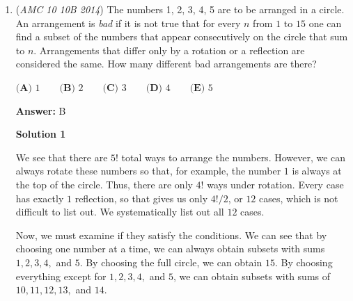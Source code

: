 \begin{enumerate}
 Thus,
 \[h = 2\sqrt{Rr}\]

 The volume of the frustum is:
 \[V_f = \frac{\pi h}{3}(R^2 + Rr + r^2) = \frac{2\pi\sqrt{Rr}}{3}(R^2 + Rr + r^2)\]

 The volume of the sphere is:
 \[V_s = \frac{4}{3}\pi a^3 = \frac{4}{3}\pi (Rr)^{3/2}\]

 The given condition $V_f = 2V_s$ becomes:
 \[\frac{2\pi\sqrt{Rr}}{3}(R^2 + Rr + r^2) = \frac{8\pi}{3}(Rr)^{3/2}\]

 Multiplying by $\frac{3}{\pi}$:
 \[2\sqrt{Rr}(R^2 + Rr + r^2) = 8(Rr)^{3/2}\]

 Dividing by $2\sqrt{Rr}$:
 \[R^2 + Rr + r^2 = 4Rr\]
 \[R^2 - 3Rr + r^2 = 0\]

 Dividing by $r^2$ and setting $x = \frac{R}{r}$:
 \[x^2 - 3x + 1 = 0\]
 \[x = \frac{3 \pm \sqrt{9 - 4}}{2} = \frac{3 \pm \sqrt{5}}{2}\]

 Since $R > r$ (the bottom base is larger), we take the larger root:
 \[\frac{R}{r} = \frac{3 + \sqrt{5}}{2}\]

 The final ratio is $\boxed{\textbf{(E) } \frac{3 + \sqrt{5}}{2}}$.

 (Note: This solution is still fundamentally similar to the previous ones)

 


	\item (\textit{AMC 10 10B 2014}) The numbers 1, 2, 3, 4, 5 are to be arranged in a circle. An arrangement is \textit{bad} if it is not true that for every $n$ from $1$ to $15$ one can find a subset of the numbers that appear consecutively on the circle that sum to $n$. Arrangements that differ only by a rotation or a reflection are considered the same. How many different bad arrangements are there?


 $\textbf {(A) } 1 \qquad \textbf {(B) } 2 \qquad \textbf {(C) } 3 \qquad \textbf {(D) } 4 \qquad \textbf {(E) } 5$

 \textbf{Answer: }B



\textbf{Solution 1}

We see that there are $5!$ total ways to arrange the numbers. However, we can always rotate these numbers so that, for example, the number $1$ is always at the top of the circle. Thus, there are only $4!$ ways under rotation. Every case has exactly $1$ reflection, so that gives us only $4!/2$, or $12$ cases, which is not difficult to list out. We systematically list out all $12$ cases. 

 Now, we must examine if they satisfy the conditions. We can see that by choosing one number at a time, we can always obtain subsets with sums $1, 2, 3, 4,$ and $5$. By choosing the full circle, we can obtain $15$. By choosing everything except for $1, 2, 3, 4,$ and $5$, we can obtain subsets with sums of $10, 11, 12, 13,$ and $14$. 


\end{enumerate}
